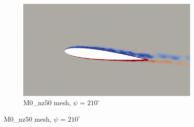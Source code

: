 \begin{figure}[H]
	\centering
	\begin{center}
		\begin{subfigure}[b]{0.6\textwidth}
			\centering
			\includegraphics[width=1\textwidth]{figures/zonal_adapt_results/vorticity_plots_Re200k/M0/phase_210.png}
			\caption{M0\_nz50 mesh, $\psi$ = $210^\circ$}
			\label{fig:M0_Re200k_sp_psi210}
		\end{subfigure}
	\end{center}


\end{figure}
